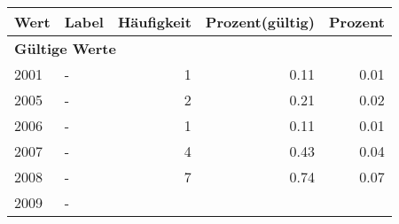      \begin{longtable}{lXrrr}
     \toprule
     \textbf{Wert} & \textbf{Label} & \textbf{Häufigkeit} & \textbf{Prozent(gültig)} & \textbf{Prozent} \\
     \endhead
     \midrule
     \multicolumn{5}{l}{\textbf{Gültige Werte}}\\

     2001 &
     \multicolumn{1}{X}{ -  } &


       \num{1} &
       \num[round-mode=places,round-precision=2]{0.11} &
         \num[round-mode=places,round-precision=2]{0.01} \\

     2005 &
     \multicolumn{1}{X}{ -  } &


       \num{2} &
       \num[round-mode=places,round-precision=2]{0.21} &
         \num[round-mode=places,round-precision=2]{0.02} \\

     2006 &
     \multicolumn{1}{X}{ -  } &


       \num{1} &
       \num[round-mode=places,round-precision=2]{0.11} &
         \num[round-mode=places,round-precision=2]{0.01} \\

     2007 &
     \multicolumn{1}{X}{ -  } &


       \num{4} &
       \num[round-mode=places,round-precision=2]{0.43} &
         \num[round-mode=places,round-precision=2]{0.04} \\

     2008 &
     \multicolumn{1}{X}{ -  } &


       \num{7} &
       \num[round-mode=places,round-precision=2]{0.74} &
         \num[round-mode=places,round-precision=2]{0.07} \\

     2009 &
     \multicolumn{1}{X}{ -  } &



\end{longtable}
